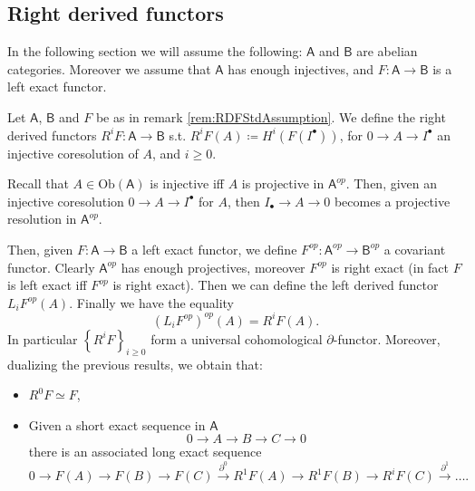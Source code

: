 \subsection{Right derived functors}
\begin{rem}\label{rem:RDFStdAssumption}
	In the following section we will assume the following:
	$\mathsf{A}$ and $\mathsf{B}$ are abelian categories.
	Moreover we assume that $\mathsf{A}$ has enough injectives, and
	$F\colon\mathsf{A} \to \mathsf{B}$ is a left exact functor.
\end{rem}

\begin{defn}
	Let $\mathsf{A}$, $\mathsf{B}$ and $F$ be as in remark \ref{rem:RDFStdAssumption}.
	We define the right derived functors
	$R^i F\colon\mathsf{A} \to \mathsf{B}$ s.t.
	$R^iF(A) \coloneqq H^i \left( F(I^\bullet) \right)$,
	for $0 \to A \to I^\bullet$ an injective coresolution of $A$, and $i \geq 0$.
\end{defn}

\begin{rem}[Important!]
	Recall that $A \in \mathrm{Ob} \left(\mathsf{A}\right)$ is injective
	iff $A$ is projective in $\mathsf{A}^{op}$.
	Then, given an injective coresolution $0 \to A \to I^\bullet$ for $A$,
	then $I_{\bullet} \to A \to 0$ becomes a projective resolution in $\mathsf{A}^{op}$.

	Then, given $F\colon\mathsf{A} \to \mathsf{B}$ a left exact functor, 
	we define $F^{op}\colon\mathsf{A}^{op} \to \mathsf{B}^{op}$ a covariant functor.
	Clearly $\mathsf{A}^{op}$ has enough projectives, moreover $F^{op}$ is right exact
	(in fact $F$ is left exact iff $F^{op}$ is right exact).
	Then we can define the left derived functor $L_iF^{op}(A)$.
	Finally we have the equality
	\begin{equation}
		\left( L_i F^{op} \right)^{op} (A) = R^i F(A)
	.\end{equation} 
	In particular $\left\{ R^iF \right\}_{i \geq 0}$ form a universal cohomological $\partial$-functor.
	Moreover, dualizing the previous results, we obtain that:
	\begin{itemize}
		\item $R^0F \simeq F$,
		\item Given a short exact sequence in $\mathsf{A}$
			\begin{equation}
			0 \to A \to B \to C \to 0
			\end{equation} 
			there is an associated long exact sequence
			\begin{equation}
				0 \to F(A) \to F(B) \to F(C) \xrightarrow{\partial^0} 
				R^1F(A) \to R^1F(B) \to R^iF(C) \xrightarrow{\partial^1} 
				\ldots
			.\end{equation} 
	\end{itemize}
\end{rem}

